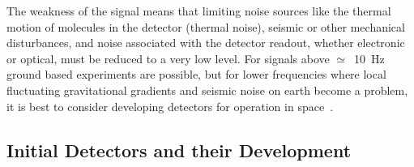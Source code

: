 \documentclass{article}
\begin{document}

The weakness of the signal means that limiting noise sources like the thermal
motion of molecules in the detector (thermal noise), seismic or other mechanical
disturbances, and noise associated with the detector readout, whether electronic
or optical, must be reduced to a very low level. For signals above
$\simeq$~10~Hz ground based experiments are possible, but for lower frequencies
where local fluctuating gravitational gradients and seismic noise on earth
become a problem, it is best to consider developing detectors for operation in
space~\cite{LISA}.




\subsection{Initial Detectors and their Development}
\label{subsection:initdet}
\end{document}
